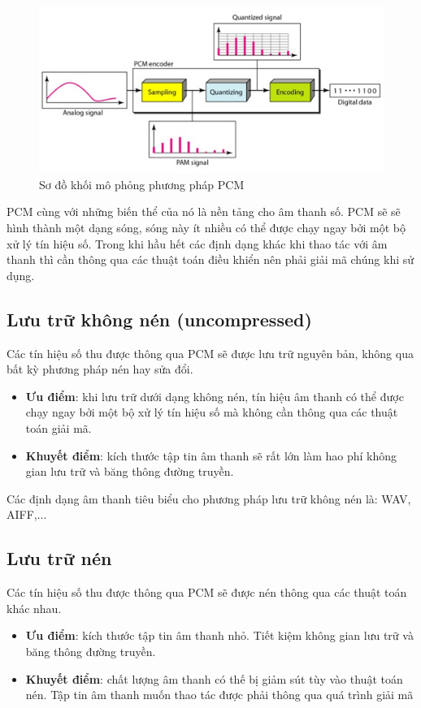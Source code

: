 \begin{figure}[h]
    \centering
    \includegraphics[scale=1]{pcm}
    \caption{Sơ đồ khối mô phỏng phương pháp PCM}
    \label{fig:c2_pcm}
\end{figure}

PCM cùng với những biến thể của nó là nền tảng cho âm thanh số. PCM sẽ sẽ hình thành một dạng sóng, sóng này ít nhiều có thể được chạy ngay bởi một bộ xử lý tín hiệu số. Trong khi hầu hết các định dạng khác khi thao tác với âm thanh thì cần thông qua các thuật toán điều khiển nên phải giải mã chúng khi sử dụng.

\subsection{Lưu trữ không nén (uncompressed)}
Các tín hiệu số thu được thông qua PCM sẽ được lưu trữ nguyên bản, không qua bất kỳ phương pháp nén hay sửa đổi.
\begin{itemize}
	\item \textbf{Ưu điểm}: khi lưu trữ dưới dạng không nén, tín hiệu âm thanh có thể được chạy ngay bởi một bộ xử lý tín hiệu số mà không cần thông qua các thuật toán giải mã.
	\item \textbf{Khuyết điểm}: kích thước tập tin âm thanh sẽ rất lớn làm hao phí không gian lưu trữ và băng thông đường truyền.
\end{itemize}
Các định dạng âm thanh tiêu biểu cho phương pháp lưu trữ không nén là: WAV, AIFF,...

\subsection{Lưu trữ nén}
Các tín hiệu số thu được thông qua PCM sẽ được nén thông qua các thuật toán khác nhau.
\begin{itemize}
	\item \textbf{Ưu điểm}: kích thước tập tin âm thanh nhỏ. Tiết kiệm không gian lưu trữ và băng thông đường truyền.
	\item \textbf{Khuyết điểm}: chất lượng âm thanh có thế bị giảm sút tùy vào thuật toán nén. Tập tin âm thanh muốn thao tác được phải thông qua quá trình giải mã
\end{itemize}

